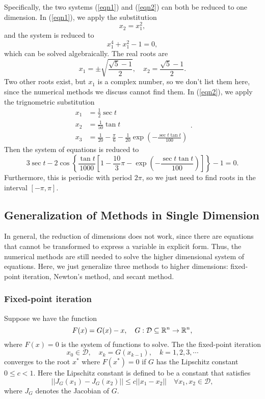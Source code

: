 \begin{table}[H]
Specifically, the two systems (\ref{eqn1}) and (\ref{eqn2}) can both be reduced to one dimension.
In (\ref{eqn1}), we apply the substitution
\[ x_2=x_1^2, \]
and the system is reduced to
\begin{equation}\label{eqn1reduce}
x_1^4+x_1^2-1=0,
\end{equation}
which can be solved algebraically.
The real roots are
\[ x_1=\pm\sqrt{\frac{\sqrt{5}-1}{2}}, \quad x_2=\frac{\sqrt{5}-1}{2}. \]
Two other roots exist, but \(x_1\) is a complex number, so we don't list them here, since the numerical methods we discuss cannot find them.
In (\ref{eqn2}), we apply the trignometric substitution
\[ \begin{aligned} x_1&=\frac{1}{2}\sec t \\ x_2&=\frac{1}{50}\tan t\\
x_3&=\frac{1}{20}-\frac{\pi}{6}-\frac{1}{20}\exp\left(-\frac{\sec t\tan t}{100} \right) \end{aligned}. \]
Then the system of equations is reduced to
\begin{equation}\label{eqn2reduce}
3\sec t-2\cos\left\{ \frac{\tan t}{1000} \left[ 1-\frac{10}{3}\pi-\exp\left(-\frac{\sec t\tan t}{100} \right) \right] \right\}-1=0. 
\end{equation}
Furthermore, this is periodic with period \(2\pi\), so we just need to find roots in the interval \([-\pi,\pi]\).

\subsection{Generalization of Methods in Single Dimension}
In general, the reduction of dimensions does not work, since there are equations that cannot be transformed to express a variable in explicit form.
Thus, the numerical methods are still needed to solve the higher dimensional system of equations.
Here, we just generalize three methods to higher dimensions: fixed-point iteration,	Newton's method, and secant method.



\subsubsection{Fixed-point iteration}
Suppose we have the function
\[ F(x)=G(x)-x, \quad G:\mathcal{D}\subseteq\mathbb{R}^{n}\to\mathbb{R}^n, \]
where \(F(x)=0\) is the system of functions to solve.
The the fixed-point iteration
\[ x_0\in\mathcal{D}, \quad x_{k}=G(x_{k-1}), \quad k=1,2,3,\cdots  \]
converges to the root \(x^*\) where \(F(x^*)=0\) if \(G\) has the Lipschitz constant \(0\leq c<1\).
Here the Lipschitz constant is defined to be a constant that satisfies
\[ ||J_G(x_1)-J_G(x_2)|| \leq c ||x_1-x_2|| \quad \forall x_1,x_2\in\mathcal{D}, \]
where \(J_G\) denotes the Jacobian of \(G\).




\end{table}
